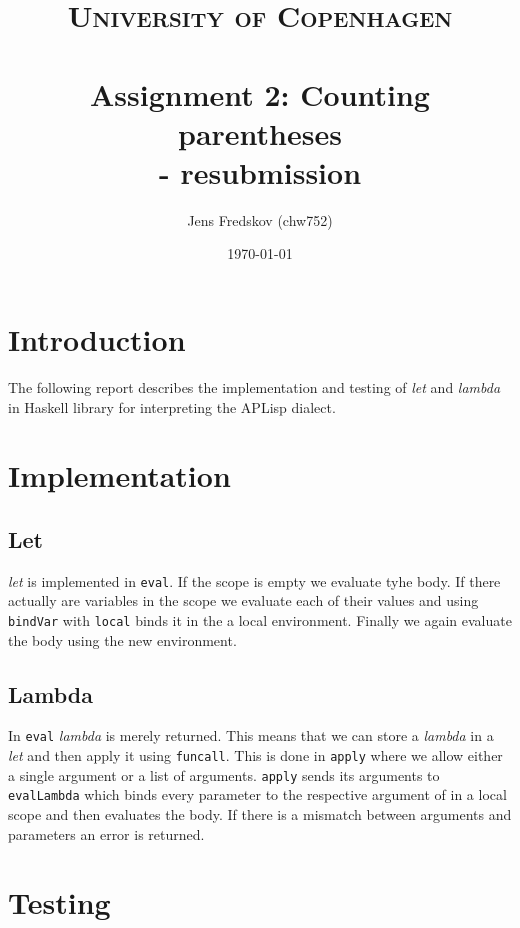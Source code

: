 \documentclass[a4paper, 11pt]{article}
\title{ 
\normalfont\normalsize 
\textsc{University of Copenhagen} \\ [25pt] %
\horrule{0.5pt} \\[0.4cm] %
\huge Assignment 2: Counting parentheses \\ \Large - resubmission %
\horrule{2pt} \\[0.5cm] %
}
\author{Jens Fredskov (chw752)} %
\date{\normalsize\today} %
\begin{document}
\maketitle

\section{Introduction} %
\label{sec:introduction}

The following report describes the implementation and testing of \emph{let} and \emph{lambda} in Haskell library for interpreting the APLisp dialect. 


\section{Implementation} %
\label{sec:implementation}

\subsection{Let} %
\label{sub:let}

\emph{let} is implemented in \texttt{eval}. If the scope is empty we evaluate tyhe body. If there actually are variables in the scope we evaluate each of their values and using \texttt{bindVar} with \texttt{local} binds it in the a local environment. Finally we again evaluate the body using the new environment.


\subsection{Lambda} %
\label{sub:lambda}

In \texttt{eval} \emph{lambda} is merely returned. This means that we can store a \emph{lambda} in a \emph{let} and then apply it using \texttt{funcall}. This is done in \texttt{apply} where we allow either a single argument or a list of arguments. \texttt{apply} sends its arguments to \texttt{evalLambda} which binds every parameter to the respective argument of in a local scope and then evaluates the body. If there is a mismatch between arguments and parameters an error is returned.



\section{Testing} %
\label{sec:testing}
\end{document}
